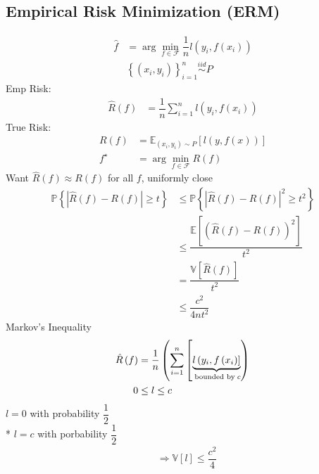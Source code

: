 \documentclass{article}
\begin{document}
\subsection{Empirical Risk Minimization (ERM)}
\begin{align*}
\hat{f} &= \arg\displaystyle\min_{f \in \mathcal{F}} \dfrac{1}{n} l\left(y_{i}, f\left(x_{i}\right)\right)
\\ &\left\{\left(x_{i}, y_{i}\right)\right\}_{i=1}^{n} \stackrel{iid}{\sim} P 
\end{align*}
Emp Risk:
\begin{align*}
\hat{R}\left(f\right) &= \dfrac{1}{n} \displaystyle\sum_{i=1}^{n} l\left(y_{i}, f\left(x_{i}\right)\right)
\end{align*}
True Risk:
\begin{align*}
R\left(f\right)  &= \mathbb{E}_{\left(x_{i}, y_{i}\right) \sim  P} \left[l\left(y, f\left(x\right)\right)\right]
\\ f^\star  &= \arg\displaystyle\min_{f \in \mathcal{F}} R\left(f \right)
\end{align*}
Want $\hat{R}\left(f\right) \approx R\left(f \right)$ for all $f $, uniformly close
\begin{align*}
\mathbb{P}\left\{| \hat{R}\left(f\right) - R\left(f\right) | \geq  t\right\} &\leq  \mathbb{P}\left\{| \hat{R}\left(f\right) - R\left(f\right) |^{2} \geq  t^{2}\right\}
\\ &\leq  \dfrac{\mathbb{E}\left[\left(\hat{R}\left(f\right) - R\left(f\right)\right)^{2}\right]}{t^{2}}
\\ &= \dfrac{\mathbb{V}\left[\hat{R}\left(f\right)\right]}{t^{2}}
\\ &\leq  \dfrac{c^{2}}{4 n t^{2}}
\end{align*}
Markov's Inequality
\begin{align*}
\hat{R}\left(f\right) &= \dfrac{1}{n} \left(\displaystyle\sum_{i=1}^{n} \left[\underbrace{l\left(y_{i}, f\left(x_{i}\right)\right]}_{\text{\;bounded by\;} c }\right)\right.
\\ 0 &\leq  l \leq  c
\end{align*}
$l = 0$ with probability $\dfrac{1}{2}$
\\* $l = c$ with porbability $\dfrac{1}{2}$
\begin{align*}
&\Rightarrow  \mathbb{V}\left[l\right] \leq  \dfrac{c^{2}}{4}
\end{align*}
\end{document}
